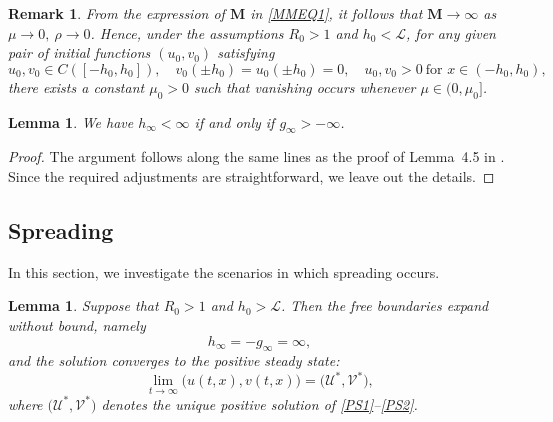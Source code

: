 \documentclass[a4paper,11pt]{amsart}
\newtheorem{lemma}[theorem]{Lemma}
\newtheorem{remark}{Remark}
\theoremstyle{definition}
\numberwithin{equation}{section}
\theoremstyle{definition}
\begin{document}
\begin{remark}\label{Remarkvanishing}
From the expression of $\mathbf{M}$ in \eqref{MMEQ1}, it follows that $\mathbf{M} \to \infty$ as $\mu \to 0,~\rho \rightarrow 0$.
Hence, under the assumptions $R_0 > 1$ and $h_0 < \mathcal{L}$,
for any given pair of initial functions $(u_0,v_0)$ satisfying
\[
u_{0}, v_{0} \in C\!\left([-h_{0},h_{0}]\right),
\quad v_{0}(\pm h_{0})=u_{0}(\pm h_{0}) = 0,
\quad u_{0}, v_{0} > 0 \ \text{for } x \in (-h_{0},h_{0}),
\]
there exists a constant $\mu_0 > 0$ such that vanishing occurs whenever $\mu \in (0,\mu_0]$.
\end{remark}
\begin{lemma}\label{samfreeboundar}
We have $h_\infty < \infty$ if and only if $g_\infty > -\infty$.
\end{lemma}

\begin{proof}
The argument follows along the same lines as the proof of Lemma~4.5 in \cite{Du}. Since the required adjustments are straightforward, we leave out the details.
\end{proof}

\subsection{Spreading}

In this section, we investigate the scenarios in which spreading occurs.

\begin{lemma}
Suppose that $R_0 > 1$ and $h_0 > \mathcal{L}$. Then the free boundaries expand without bound, namely
\[
h_\infty = -g_\infty = \infty,
\]
and the solution converges to the positive steady state:
\[
\lim_{t \to \infty} \bigl(u(t,x), v(t,x)\bigr) = \bigl(\mathscr{U}^\ast, \mathscr{V}^\ast\bigr),
\]
where $\bigl(\mathscr{U}^\ast, \mathscr{V}^\ast\bigr)$ denotes the unique positive solution of \eqref{PS1}--\eqref{PS2}.
\end{lemma}
\end{document}
